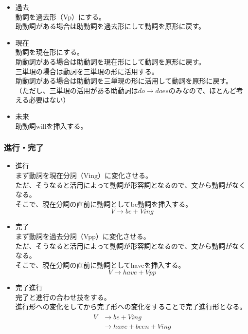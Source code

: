 \begin{itemize}
  \item 過去\\
  動詞を過去形（Vp）にする。\\
  助動詞がある場合は助動詞を過去形にして動詞を原形に戻す。
  \item 現在\\
  動詞を現在形にする。\\
  助動詞がある場合は助動詞を現在形にして動詞を原形に戻す。\\
  三単現の場合は動詞を三単現の形に活用する。\\
  助動詞がある場合は助動詞を三単現の形に活用して動詞を原形に戻す。\\
  （ただし、三単現の活用がある助動詞は$do \rightarrow does$のみなので、ほとんど考える必要はない）
  \item 未来\\
  助動詞willを挿入する。
\end{itemize}

\subsubsection{進行・完了}

\begin{itemize}
  \item 進行\\
  まず動詞を現在分詞（Ving）に変化させる。\\
  ただ、そうなると活用によって動詞が形容詞となるので、文から動詞がなくなる。\\
  そこで、現在分詞の直前に動詞としてbe動詞を挿入する。\\
  \begin{equation}
    V \rightarrow be + Ving
  \end{equation}
  \item 完了\\
  まず動詞を過去分詞（Vpp）に変化させる。\\
  ただ、そうなると活用によって動詞が形容詞となるので、文から動詞がなくなる。\\
  そこで、現在分詞の直前に動詞としてhaveを挿入する。\\
  \begin{equation}
    V \rightarrow have + Vpp
  \end{equation}
  \item 完了進行\\
  完了と進行の合わせ技をする。\\
  進行形への変化をしてから完了形への変化をすることで完了進行形となる。\\
  \begin{align}
    \begin{aligned}
      V & \rightarrow be + Ving\\
        & \rightarrow have + been + Ving
    \end{aligned}
  \end{align}
\end{itemize}

